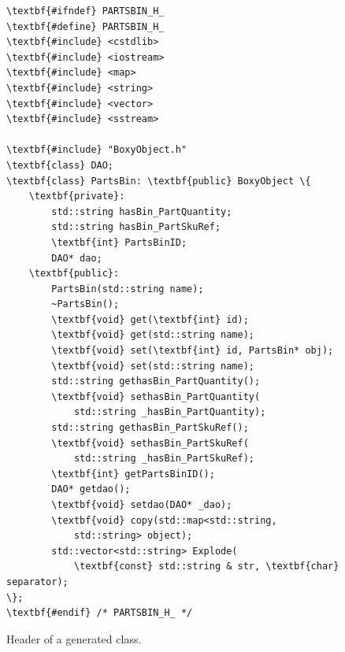 \begin{figure}[t!h!]
\begin{minipage}{.5\paperwidth}
\begin{mylisting}
\begin{Verbatim}[commandchars=\\\{\},fontsize=\scriptsize, numbersep=2pt]
\textbf{#ifndef} PARTSBIN_H_
\textbf{#define} PARTSBIN_H_
\textbf{#include} <cstdlib>
\textbf{#include} <iostream>
\textbf{#include} <map>
\textbf{#include} <string>
\textbf{#include} <vector>
\textbf{#include} <sstream>

\textbf{#include} "BoxyObject.h"
\textbf{class} DAO;
\textbf{class} PartsBin: \textbf{public} BoxyObject \{
    \textbf{private}:
        std::string hasBin_PartQuantity;
        std::string hasBin_PartSkuRef;
        \textbf{int} PartsBinID;
        DAO* dao;
    \textbf{public}:
        PartsBin(std::string name);
        ~PartsBin();
        \textbf{void} get(\textbf{int} id);
        \textbf{void} get(std::string name);
        \textbf{void} set(\textbf{int} id, PartsBin* obj);
        \textbf{void} set(std::string name);
        std::string gethasBin_PartQuantity();
        \textbf{void} sethasBin_PartQuantity(
            std::string _hasBin_PartQuantity);
        std::string gethasBin_PartSkuRef();
        \textbf{void} sethasBin_PartSkuRef(
            std::string _hasBin_PartSkuRef);
        \textbf{int} getPartsBinID();
        DAO* getdao();
        \textbf{void} setdao(DAO* _dao);
        \textbf{void} copy(std::map<std::string,
            std::string> object);
        std::vector<std::string> Explode(
            \textbf{const} std::string & str, \textbf{char} separator);
\};
\textbf{#endif} /* PARTSBIN_H_ */
\end{Verbatim}
\end{mylisting}
\end{minipage}
\caption{Header of a generated class.}
\label{fig:headerclass}
\end{figure}



%




